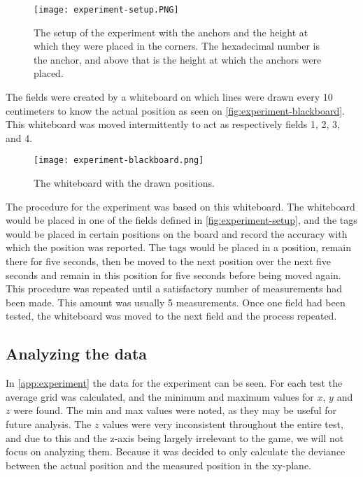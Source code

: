 \begin{figure}[H]
    \centering
    \texttt{[image: experiment-setup.PNG]}
    \caption{The setup of the experiment with the anchors and the height at which they were placed in the corners. The hexadecimal number is the anchor, and above that is the height at which the anchors were placed.}
    \label{fig:experiment-setup}
\end{figure}
\noindent
The fields were created by a whiteboard on which lines were drawn every 10 centimeters to know the actual position as seen on \autoref{fig:experiment-blackboard}.
This whiteboard was moved intermittently to act as respectively fields 1, 2, 3, and 4.

\begin{figure}[H]
    \centering
    \texttt{[image: experiment-blackboard.png]}
    \caption{The whiteboard with the drawn positions.}
    \label{fig:experiment-blackboard}
\end{figure}
\noindent
The procedure for the experiment was based on this whiteboard.
The whiteboard would be placed in one of the fields defined in \autoref{fig:experiment-setup}, and the tags would be placed in certain positions on the board and record the accuracy with which the position was reported.
The tags would be placed in a position, remain there for five seconds, then be moved to the next position over the next five seconds and remain in this position for five seconds before being moved again.
This procedure was repeated until a satisfactory number of measurements had been made.
This amount was usually 5 measurements.
Once one field had been tested, the whiteboard was moved to the next field and the process repeated.

\subsection{Analyzing the data}
In \autoref{app:experiment} the data for the experiment can be seen.
For each test the average grid was calculated, and the minimum and maximum values for $x$, $y$ and $z$ were found.
The min and max values were noted, as they may be useful for future analysis.
The $z$ values were very inconsistent throughout the entire test, and due to this and the z-axis being largely irrelevant to the game, we will not focus on analyzing them.
Because it was decided to only calculate the deviance between the actual position and the measured position in the xy-plane.

